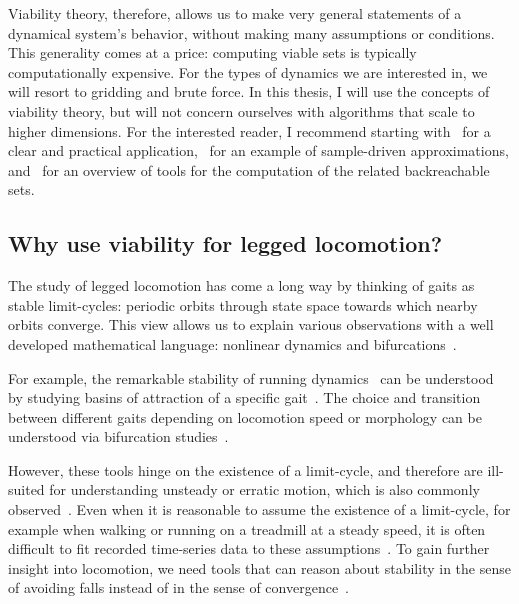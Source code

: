 Viability theory, therefore, allows us to make very general statements of a dynamical system's behavior, without making many assumptions or conditions. This generality comes at a price: computing viable sets is typically computationally expensive. For the types of dynamics we are interested in, we will resort to gridding and brute force. In this thesis, I will use the concepts of viability theory, but will not concern ourselves with algorithms that scale to higher dimensions. For the interested reader, I recommend starting with~\cite{liniger2017real} for a clear and practical application,~\cite{deffuant2007approximating} for an example of sample-driven approximations, and~\cite{bansal2017hamilton} for an overview of tools for the computation of the related backreachable sets.

\subsection{Why use viability for legged locomotion?}

The study of legged locomotion has come a long way by thinking of gaits as stable limit-cycles: periodic orbits through state space towards which nearby orbits converge. This view allows us to explain various observations with a well developed mathematical language: nonlinear dynamics and bifurcations~\cite{strogatz2018nonlinear}. \par
For example, the remarkable stability of running dynamics~\cite{daley2006running} can be understood by studying basins of attraction of a specific gait~\cite{merker2015stable,cnops2015basin}. The choice and transition between different gaits depending on locomotion speed or morphology can be understood via bifurcation studies~\cite{owaki2013simple,aoi2013stability,gan2018all}. \par

However, these tools hinge on the existence of a limit-cycle, and therefore are ill-suited for understanding unsteady or erratic motion, which is also commonly observed~\cite{wheatley2015escape,moore2017unpredictability}.
Even when it is reasonable to assume the existence of a limit-cycle, for example when walking or running on a treadmill at a steady speed, it is often difficult to fit recorded time-series data to these assumptions~\cite{bruijn2013assessing, maus2015constructing}. To gain further insight into locomotion, we need tools that can reason about stability in the sense of avoiding falls instead of in the sense of convergence~\cite{Birn-Jeffery3786}. \par

